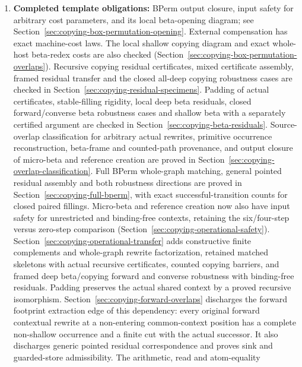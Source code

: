 \begin{enumerate}
through any semantic correction required by the remaining full-machine and
paper-correspondence obligations of Section~\ref{sec:paper-correspondence}. Unrestricted
zero-input-hole closure is refuted, as recorded in Appendix~B.1.
\item \textbf{Completed template obligations:} BPerm output closure, input safety for arbitrary cost parameters, and its local beta-opening diagram; see Section~\ref{sec:copying-box-permutation-opening}. External compensation has exact machine-cost laws. The local shallow copying
diagram and exact whole-host beta-redex costs are also checked
(Section~\ref{sec:copying-box-permutation-overlaps}). Recursive copying residual
certificates, mixed certificate assembly, framed residual transfer and the
closed all-deep copying robustness cases are checked in
Section~\ref{sec:copying-residual-specimens}. Padding of actual certificates,
stable-filling rigidity, local deep beta residuals, closed forward/converse
beta robustness cases and shallow beta with a separately certified argument
are checked in Section~\ref{sec:copying-beta-residuals}. Source-overlap
classification for arbitrary actual rewrites, primitive occurrence reconstruction,
beta-frame and counted-path provenance, and output closure of micro-beta and
reference creation are proved in Section~\ref{sec:copying-overlap-classification}.
Full BPerm whole-graph matching, general pointed residual assembly and both
robustness directions are proved in Section~\ref{sec:copying-full-bperm},
with exact successful-transition counts for closed paired fillings.
Micro-beta and reference creation now also have input safety for unrestricted
and binding-free contexts, retaining the six/four-step versus zero-step
comparison (Section~\ref{sec:copying-operational-safety}).
Section~\ref{sec:copying-operational-transfer} adds constructive finite
complements and whole-graph rewrite factorization, retained matched
skeletons with actual recursive certificates, counted copying barriers,
and framed deep beta/copying forward and converse robustness with
binding-free residuals. Padding preserves the actual shared context by a
proved recursive isomorphism.
Section~\ref{sec:copying-forward-overlaps} discharges the forward footprint
extraction edge of this dependency: every original forward contextual rewrite at a non-entering common-context
position has a complete non-shallow occurrence and a finite cut with the actual successor.
It also discharges generic pointed residual correspondence and proves sink
and guarded-store admissibility. The arithmetic, read and atom-equality

\end{enumerate}
